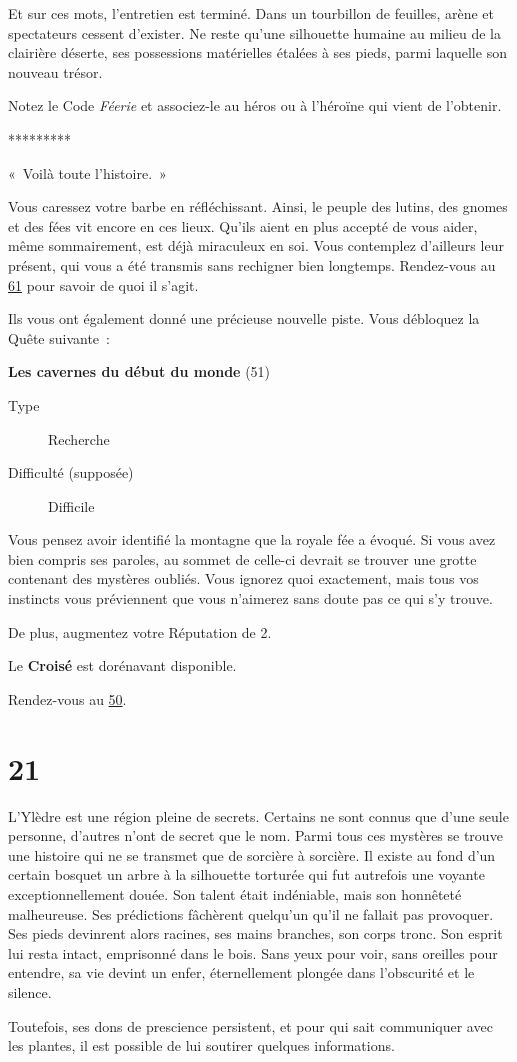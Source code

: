 \documentclass{report}
\newcommand{\gsection}[1]{
    \section{#1}
    \label{section-#1}
}
\newcommand{\glink}[1]{\hyperref[section-#1]{#1}}
\newcommand{\quest}[5]{
    \begin{mdframed}[innertopmargin=0.5cm,innerbottommargin=0.5cm,leftmargin=0.5cm,rightmargin=0.5cm]
        \begin{center}
            \textbf{#1} (#2)
        \end{center}
        \begin{description}
            \item[Type] #3
            \item[Difficulté (supposée)] #4
        \end{description}
        #5
    \end{mdframed}
}
\newcommand{\ellipse}{
    \begin{center}
        *********
    \end{center}
}
\newcommand{\hero}[1]{\textbf{#1}}
\begin{document}
Et sur ces mots, l'entretien est terminé. Dans un tourbillon de feuilles, arène et spectateurs cessent d'exister. Ne reste qu'une silhouette humaine au milieu de la clairière déserte, ses possessions matérielles étalées à ses pieds, parmi laquelle son nouveau trésor.

Notez le Code \emph{Féerie} et associez-le au héros ou à l'héroïne qui vient de l'obtenir.

\ellipse

« Voilà toute l'histoire. »

Vous caressez votre barbe en réfléchissant. Ainsi, le peuple des lutins, des gnomes et des fées vit encore en ces lieux. Qu'ils aient en plus accepté de vous aider, même sommairement, est déjà miraculeux en soi. Vous contemplez d'ailleurs leur présent, qui vous a été transmis sans rechigner bien longtemps. Rendez-vous au \glink{61} pour savoir de quoi il s'agit.

Ils vous ont également donné une précieuse nouvelle piste. Vous débloquez la Quête suivante :

\quest{Les cavernes du début du monde}{51}{Recherche}{Difficile}{
Vous pensez avoir identifié la montagne que la royale fée a évoqué. Si vous avez bien compris ses paroles, au sommet de celle-ci devrait se trouver une grotte contenant des mystères oubliés. Vous ignorez quoi exactement, mais tous vos instincts vous préviennent que vous n'aimerez sans doute pas ce qui s'y trouve.
}

De plus, augmentez votre Réputation de 2.

Le \hero{Croisé} est dorénavant disponible.

Rendez-vous au \glink{50}.

\gsection{21}

L'Ylèdre est une région pleine de secrets. Certains ne sont connus que d'une seule personne, d'autres n'ont de secret que le nom. Parmi tous ces mystères se trouve une histoire qui ne se transmet que de sorcière à sorcière. Il existe au fond d'un certain bosquet un arbre à la silhouette torturée qui fut autrefois une voyante exceptionnellement douée. Son talent était indéniable, mais son honnêteté malheureuse. Ses prédictions fâchèrent quelqu'un qu'il ne fallait pas provoquer. Ses pieds devinrent alors racines, ses mains branches, son corps tronc. Son esprit lui resta intact, emprisonné dans le bois. Sans yeux pour voir, sans oreilles pour entendre, sa vie devint un enfer, éternellement plongée dans l'obscurité et le silence.

Toutefois, ses dons de prescience persistent, et pour qui sait communiquer avec les plantes, il est possible de lui soutirer quelques informations.
\end{document}
